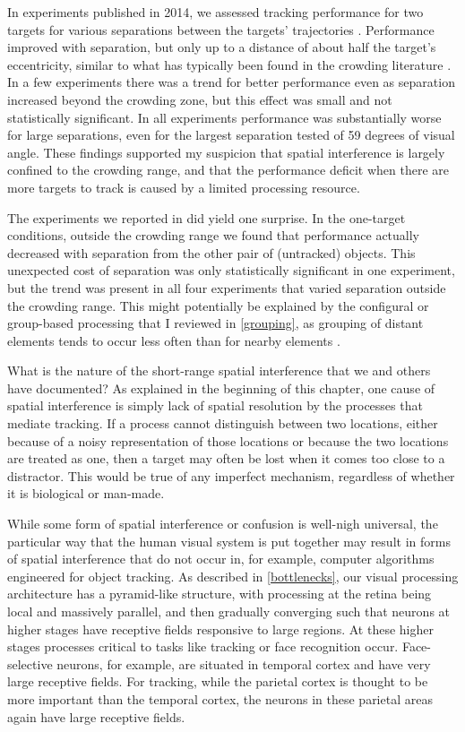 \documentclass[
]{book}
\begin{document}
In experiments published in 2014, we assessed tracking performance for two targets for various separations between the targets' trajectories \citep{holcombeObjectTrackingAbsence2014}. Performance improved with separation, but only up to a distance of about half the target's eccentricity, similar to what has typically been found in the crowding literature \citep{strasburgerDancingLettersTicks2014}. In a few experiments there was a trend for better performance even as separation increased beyond the crowding zone, but this effect was small and not statistically significant. In all experiments performance was substantially worse for large separations, even for the largest separation tested of 59 degrees of visual angle. These findings supported my suspicion that spatial interference is largely confined to the crowding range, and that the performance deficit when there are more targets to track is caused by a limited processing resource.

The experiments we reported in \citet{holcombeObjectTrackingAbsence2014} did yield one surprise. In the one-target conditions, outside the crowding range we found that performance actually decreased with separation from the other pair of (untracked) objects. This unexpected cost of separation was only statistically significant in one experiment, but the trend was present in all four experiments that varied separation outside the crowding range. This might potentially be explained by the configural or group-based processing that I reviewed in \ref{grouping}, as grouping of distant elements tends to occur less often than for nearby elements \citep[e.g.,][]{kubovyLawfulnessGroupingProximity1998}.

What is the nature of the short-range spatial interference that we and others have documented? As explained in the beginning of this chapter, one cause of spatial interference is simply lack of spatial resolution by the processes that mediate tracking. If a process cannot distinguish between two locations, either because of a noisy representation of those locations or because the two locations are treated as one, then a target may often be lost when it comes too close to a distractor. This would be true of any imperfect mechanism, regardless of whether it is biological or man-made.

While some form of spatial interference or confusion is well-nigh universal, the particular way that the human visual system is put together may result in forms of spatial interference that do not occur in, for example, computer algorithms engineered for object tracking. As described in \ref{bottlenecks}, our visual processing architecture has a pyramid-like structure, with processing at the retina being local and massively parallel, and then gradually converging such that neurons at higher stages have receptive fields responsive to large regions. At these higher stages processes critical to tasks like tracking or face recognition occur. Face-selective neurons, for example, are situated in temporal cortex and have very large receptive fields. For tracking, while the parietal cortex is thought to be more important than the temporal cortex, the neurons in these parietal areas again have large receptive fields.
\end{document}
